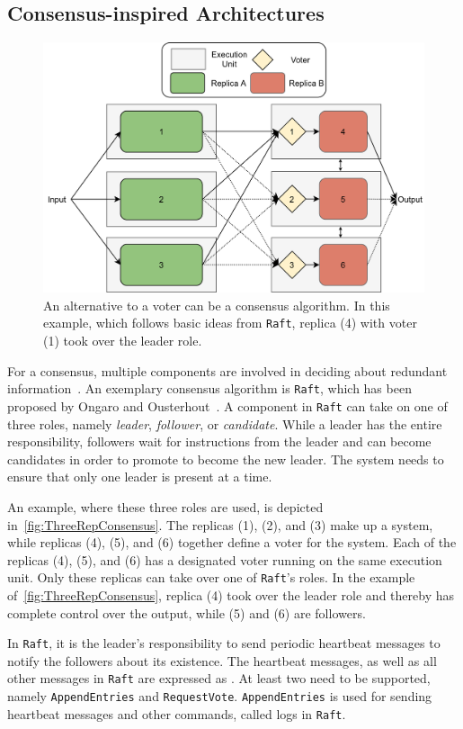 \subsection{Consensus-inspired Architectures}
\begin{figure}[!hb]
	\centering
	\includegraphics[width=0.75\linewidth]{images/ThreeComponentConsensus}
	\caption{An alternative to a voter can be a consensus algorithm. In this example, which follows basic ideas from \texttt{Raft}, replica (4) with voter (1) took over the leader role.}
	\label{fig:ThreeRepConsensus}
\end{figure}

For a consensus, multiple components are involved in deciding about redundant information~.
An exemplary consensus algorithm is \texttt{Raft}, which has been proposed by Ongaro and Ousterhout~\cite{RaftConsensusPaper}.
A component in \texttt{Raft} can take on one of three roles, namely \textit{leader}, \textit{follower}, or \textit{candidate}.
While a leader has the entire responsibility, followers wait for instructions from the leader and can become candidates in order to promote to become the new leader.
The system needs to ensure that only one leader is present at a time.

An example, where these three roles are used, is depicted in~\autoref{fig:ThreeRepConsensus}.
The replicas (1), (2), and (3) make up a  system, while replicas (4), (5), and (6) together define a voter for the system.
Each of the replicas (4), (5), and (6) has a designated voter running on the same execution unit.
Only these replicas can take over one of \texttt{Raft}'s roles.
In the example of~\autoref{fig:ThreeRepConsensus}, replica (4) took over the leader role and thereby has complete control over the output, while (5) and (6) are followers.

In \texttt{Raft}, it is the leader's responsibility to send periodic heartbeat messages to notify the followers about its existence.
The heartbeat messages, as well as all other messages in \texttt{Raft} are expressed as .
At least two  need to be supported, namely \texttt{AppendEntries} and \texttt{RequestVote}.
\texttt{AppendEntries} is used for sending heartbeat messages and other commands, called logs in \texttt{Raft}.

